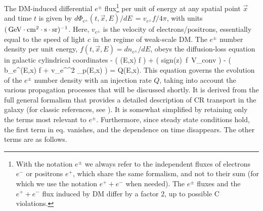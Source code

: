 \smallskip

The DM-induced differential $e^\pm$ flux\footnote{With the notation $e^\pm$ we always refer to the independent fluxes of electrons $e^-$ or positrons $e^+$, which share the same formalism, and not to their sum (for which we use the notation $e^++e^-$ when needed).
The $e^\pm$ fluxes and the $e^++e^-$ flux induced by DM differ by a factor 2, up to possible C violations.} per unit of energy  at any spatial point $\vec x$ and time $t$ is given by $d\Phi_{e^\pm}(t,\vec x,E) /dE\, = v_{e^\pm} f/4\pi$, with units $(\,{\rm GeV}\cdot{\rm cm}^2\cdot{\rm s}\cdot{\rm sr})^{-1}$.
Here, $v_{e^\pm}$ is the velocity  of electrons/positrons, essentially equal to the speed of light $c$ in the regime of weak-scale DM. 
The $e^\pm$ number density per unit energy, $f(t,\vec x,E)= dn_{e^\pm}/dE$,
obeys the diffusion-loss equation in galactic cylindrical coordinates
\beq 
\label{eq:diffeq}
-
\nabla\left( (E,\vec x) \nabla f \right) + \left( {\rm sign}(z)\, f\, V_{\rm conv} \right) 
- \left( b_{e^\pm}(E,\vec x) f + v_{e^\pm}^2 _{p}(E,\vec x)  \right) = Q(E,\vec x).
\eeq
This equation governs the evolution of the $e^\pm$ number density with an injection rate $Q$, taking into account the various propagation processes that will be discussed shortly.
It is derived from the full general formalism that provides a detailed description of CR transport in the galaxy (for classic references, see \cite{CRtransport}). It is somewhat simplified by retaining only the terms most relevant to $e^\pm$. Furthermore, since steady state conditions hold, the first term in eq. vanishes, and the dependence on time disappears. The other terms are as follows. 

